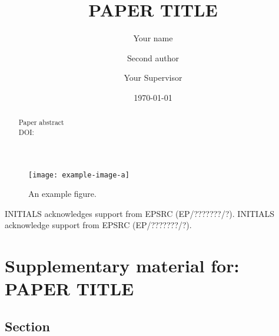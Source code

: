 \documentclass[aps,prl,twocolumn,superscriptaddress,longbibliography,nobalancelastpage,floatfix]{revtex4-2}
\begin{document}
\author{Your name}
\author{Second author}
\author{Your Supervisor}

\title{PAPER TITLE}
\date{\today} 
\begin{abstract}
	\noindent%
	Paper abstract
	\\ 

	\noindent\small{DOI:} %
\end{abstract}

\maketitle

\lipsum[1-2]

\begin{figure}
	\centering
    \vspace{-2\baselineskip}%

	\texttt{[image: example-image-a]}%
	\caption{%
			An example figure.
}
\label{fig:1}
\end{figure}


\acknowledgments
INITIALS acknowledges support from EPSRC (EP/???????/?).
INITIALS acknowledge support from EPSRC (EP/???????/?).

\clearpage

\renewcommand{\theequation}{S\arabic{equation}}
\renewcommand{\thefigure}{S\arabic{figure}}
\setcounter{section}{0}
\setcounter{equation}{0}
\setcounter{figure}{0}
\setcounter{page}{1}

\onecolumngrid
\section{Supplementary material for: PAPER TITLE}
\twocolumngrid

\subsection{Section}%

\lipsum[3-4]
\end{document}
